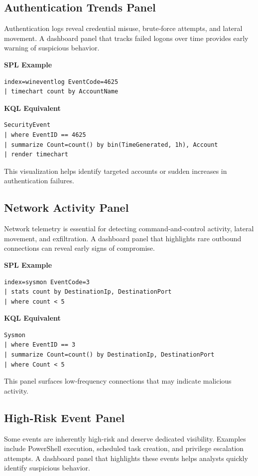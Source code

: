 \subsection*{Authentication Trends Panel}

Authentication logs reveal credential misuse, brute‑force attempts, and lateral movement. A dashboard panel that tracks 
failed logons over time provides early warning of suspicious behavior.

\textbf{SPL Example}
\begin{lstlisting}
index=wineventlog EventCode=4625
| timechart count by AccountName
\end{lstlisting}

\textbf{KQL Equivalent}
\begin{lstlisting}
SecurityEvent
| where EventID == 4625
| summarize Count=count() by bin(TimeGenerated, 1h), Account
| render timechart
\end{lstlisting}

This visualization helps identify targeted accounts or sudden increases in authentication failures.

\subsection*{Network Activity Panel}

Network telemetry is essential for detecting command‑and‑control activity, lateral movement, and exfiltration. A dashboard 
panel that highlights rare outbound connections can reveal early signs of compromise.

\textbf{SPL Example}
\begin{lstlisting}
index=sysmon EventCode=3
| stats count by DestinationIp, DestinationPort
| where count < 5
\end{lstlisting}

\textbf{KQL Equivalent}
\begin{lstlisting}
Sysmon
| where EventID == 3
| summarize Count=count() by DestinationIp, DestinationPort
| where Count < 5
\end{lstlisting}

This panel surfaces low‑frequency connections that may indicate malicious activity.

\subsection*{High‑Risk Event Panel}

Some events are inherently high‑risk and deserve dedicated visibility. Examples include PowerShell execution, scheduled 
task creation, and privilege escalation attempts. A dashboard panel that highlights these events helps analysts quickly 
identify suspicious behavior.

